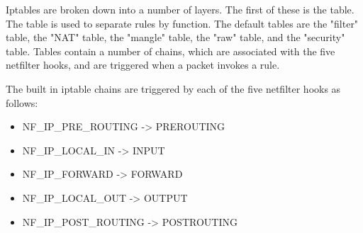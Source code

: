 Iptables are broken down into a number of layers. The first of these is the
table. The table is used to separate rules by function. The default tables are
the "filter" table, the "NAT" table, the "mangle" table, the "raw" table, and
the "security" table. Tables contain a number of chains, which are associated
with the five netfilter hooks, and are triggered when a packet invokes a rule.

The built in iptable chains are triggered by each of the five netfilter hooks as
follows:

\begin{itemize}
	\item NF\_IP\_PRE\_ROUTING -> PREROUTING
	\item NF\_IP\_LOCAL\_IN -> INPUT
	\item NF\_IP\_FORWARD -> FORWARD
	\item NF\_IP\_LOCAL\_OUT -> OUTPUT
	\item NF\_IP\_POST\_ROUTING -> POSTROUTING
\end{itemize}
